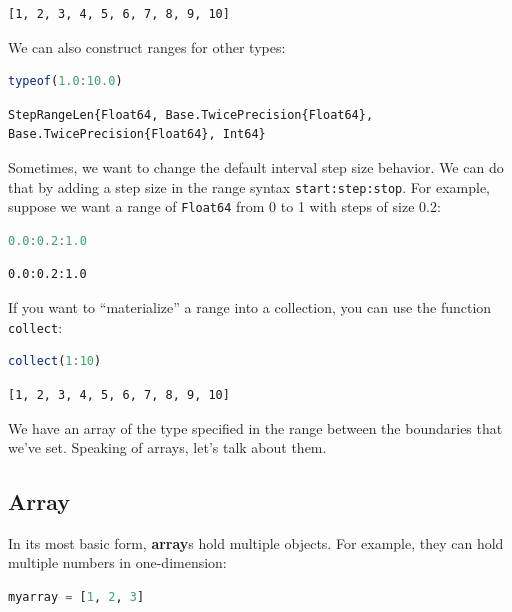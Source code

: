 \documentclass[
  notoc %
]{tufte-book}
\newcommand{\passthrough}[1]{#1}
\begin{document}
\begin{lstlisting}[language=Output]
[1, 2, 3, 4, 5, 6, 7, 8, 9, 10]
\end{lstlisting}

We can also construct ranges for other types:

\begin{lstlisting}[language=Julia]
typeof(1.0:10.0)
\end{lstlisting}

\begin{lstlisting}[language=Output]
StepRangeLen{Float64, Base.TwicePrecision{Float64}, Base.TwicePrecision{Float64}, Int64}
\end{lstlisting}

Sometimes, we want to change the default interval step size behavior. We
can do that by adding a step size in the range syntax
\passthrough{\lstinline!start:step:stop!}. For example, suppose we want
a range of \passthrough{\lstinline!Float64!} from 0 to 1 with steps of
size 0.2:

\begin{lstlisting}[language=Julia]
0.0:0.2:1.0
\end{lstlisting}

\begin{lstlisting}[language=Output]
0.0:0.2:1.0
\end{lstlisting}

If you want to ``materialize'' a range into a collection, you can use
the function \passthrough{\lstinline!collect!}:

\begin{lstlisting}[language=Julia]
collect(1:10)
\end{lstlisting}

\begin{lstlisting}[language=Output]
[1, 2, 3, 4, 5, 6, 7, 8, 9, 10]
\end{lstlisting}

We have an array of the type specified in the range between the
boundaries that we've set. Speaking of arrays, let's talk about them.

\hypertarget{sec:array}{%
\subsection{Array}\label{sec:array}}

In its most basic form, \textbf{array}s hold multiple objects. For
example, they can hold multiple numbers in one-dimension:

\begin{lstlisting}[language=Julia]
myarray = [1, 2, 3]
\end{lstlisting}
\end{document}
